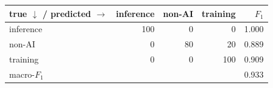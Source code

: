 \begin{tabular}{lrrrr}
\toprule
true $\downarrow$ / predicted $\rightarrow$ & inference & non-AI & training & $F_1$ \\
\midrule
inference & 100 & 0 & 0 & 1.000 \\
non-AI & 0 & 80 & 20 & 0.889 \\
training & 0 & 0 & 100 & 0.909 \\
\midrule
macro-$F_1$ & \multicolumn{4}{r}{0.933} \\
\bottomrule
\end{tabular}
